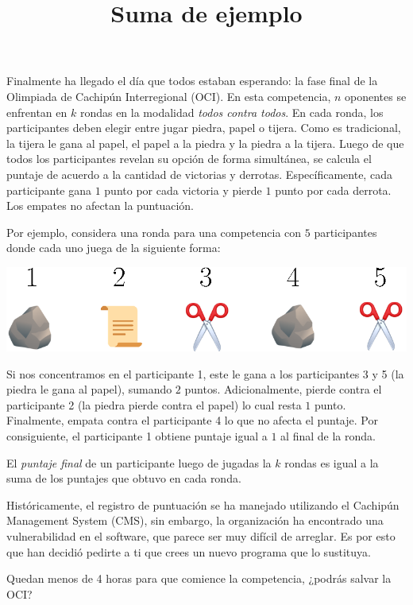 \documentclass{oci}
\title{Suma de ejemplo}
\begin{document}
\begin{problemDescription}
  Finalmente ha llegado el día que todos estaban esperando:
  la fase final de la Olimpiada de Cachipún Interregional (OCI).
  En esta competencia, $n$ oponentes se enfrentan en $k$ rondas
  en la modalidad \emph{todos contra todos}.
  En cada ronda, los participantes deben elegir entre jugar piedra, papel o tijera.
  Como es tradicional, la tijera le gana al papel, el papel a la piedra y la piedra a
  la tijera.
  Luego de que todos los participantes revelan su opción de forma simultánea, se
  calcula el puntaje de acuerdo a la cantidad de victorias y derrotas.
  Específicamente, cada participante gana $1$ punto por cada victoria
  y pierde $1$ punto por cada derrota.
  Los empates no afectan la puntuación.

  Por ejemplo, considera una ronda para una competencia con $5$ participantes donde
  cada uno juega de la siguiente forma:
  \begin{center}
    \includegraphics[scale=0.8]{ronda.eps}
  \end{center}
  Si nos concentramos en el participante 1, este le gana a los participantes 3 y 5
  (la piedra le gana al papel), sumando $2$ puntos.
  Adicionalmente, pierde contra el participante 2 (la piedra pierde contra el papel)
  lo cual resta $1$ punto.
  Finalmente, empata contra el participante 4 lo que no afecta el puntaje.
  Por consiguiente, el participante 1 obtiene puntaje igual a $1$ al final de la ronda.

  El \emph{puntaje final} de un participante luego de jugadas la $k$ rondas
  es igual a la suma de los puntajes que obtuvo en cada ronda.

  Históricamente, el registro de puntuación se ha manejado utilizando el
  Cachipún Management System (CMS), sin embargo, la organización ha encontrado
  una vulnerabilidad en el software, que parece ser muy difícil de arreglar.
  Es por esto que han decidió pedirte a ti que crees un nuevo programa que lo
  sustituya.

  Quedan menos de 4 horas para que comience la competencia, ¿podrás salvar la OCI?
\end{problemDescription}
\end{document}
